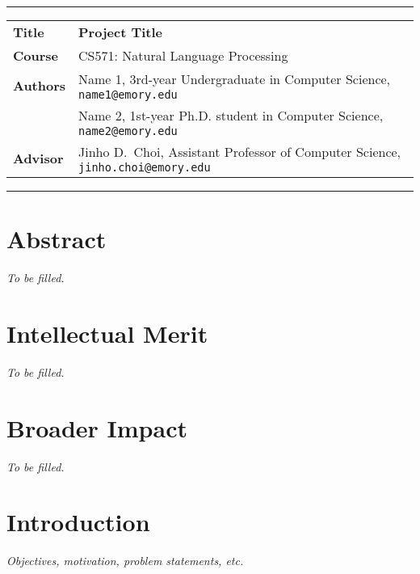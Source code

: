 \documentclass[10pt]{article}
\begin{document}
\thispagestyle{empty}

\hrule
\vspace{1mm}
\noindent\begin{tabular}{ll}
\bf Title   & \textbf{Project Title} \\
\bf Course  & CS571: Natural Language Processing \\
\bf Authors & Name 1, 3rd-year Undergraduate in Computer Science, \texttt{name1@emory.edu} \\ 
            & Name 2, 1st-year Ph.D. student in Computer Science, \texttt{name2@emory.edu} \\ 
\bf Advisor & Jinho D.\ Choi, Assistant Professor of Computer Science, \texttt{jinho.choi@emory.edu}\\
\end{tabular}
\vspace{1mm}
\hrule


\section{Abstract}

\textit{To be filled.}


\section{Intellectual Merit}

\textit{To be filled.}


\section{Broader Impact}

\textit{To be filled.}


\section{Introduction}

\textit{Objectives, motivation, problem statements, etc.}

\end{document}
